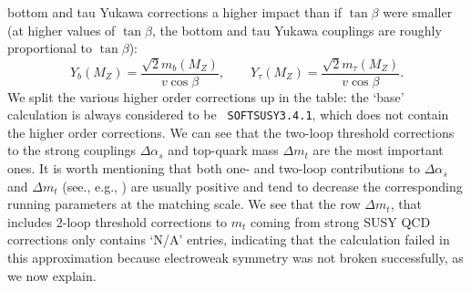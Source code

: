 \documentclass[final,3p,times,pdflatex]{elsarticle}
\begin{document}
bottom and tau Yukawa corrections a higher impact than if $\tan \beta$ were
smaller (at higher values of $\tan \beta$, the bottom and tau Yukawa couplings
are roughly proportional to $\tan \beta$):
\begin{equation}
Y_b(M_Z) = \frac{\sqrt{2}m_b(M_Z)}{v \cos \beta}, \qquad
Y_\tau(M_Z) = \frac{\sqrt{2}m_\tau(M_Z)}{v \cos \beta}.
\end{equation}
We split the various higher order corrections up in
the table: the `base' calculation is always considered to be {\tt
  SOFTSUSY3.4.1}, which does not contain the higher order corrections. 
We can see that the two-loop threshold corrections to the strong couplings $\Delta \alpha_s$ and top-quark mass $\Delta m_t$ are the most important ones. 
It is worth mentioning that both  one- and two-loop contributions to $\Delta \alpha_s$ and $\Delta m_t$ (see., e.g., \cite{Pierce:1996zz,Bednyakov:2010ni}) are usually positive and tend to decrease the corresponding running parameters at the matching scale. 
We see that the row $\Delta m_t$, that includes 2-loop threshold corrections
to $m_t$ coming from strong SUSY QCD corrections only contains `N/A' entries,
indicating that the calculation failed in this approximation because
electroweak symmetry was not broken successfully, as we now explain. 
\end{document}
